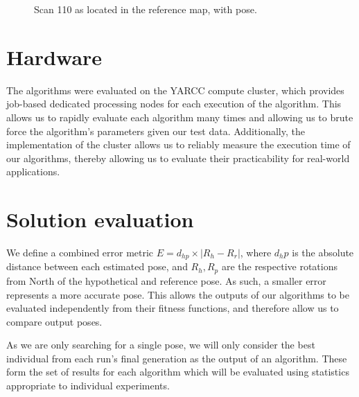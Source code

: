 \documentclass[authoryearcitations]{UoYCSproject}
\begin{document}
\begin{figure}
\begin{subfigure}[b]{0.3\textwidth}

\end{subfigure}
\caption{Scan 110 as located in the reference map, with pose.}
\label{fig:scan110}
\end{figure}

\section{Hardware}
The algorithms were evaluated on the YARCC compute cluster, which provides job-based dedicated processing nodes for each execution of the algorithm. This allows us to rapidly evaluate each algorithm many times and allowing us to brute force the algorithm's parameters given our test data. Additionally, the implementation of the cluster allows us to reliably measure the execution time of our algorithms, thereby allowing us to evaluate their practicability for real-world applications.

\section{Solution evaluation}
We define a combined error metric $E=d_{hp}\times |R_h-R_r|$, where $d_hp$ is the absolute distance between each estimated pose, and $R_h, R_p$ are the respective rotations from North of the hypothetical and reference pose. As such, a smaller error represents a more accurate pose. This allows the outputs of our algorithms to be evaluated independently from their fitness functions, and therefore allow us to compare output poses.

As we are only searching for a single pose, we will only consider the best individual from each run's final generation as the output of an algorithm. These form the set of results for each algorithm which will be evaluated using statistics appropriate to individual experiments. 
\end{document}
